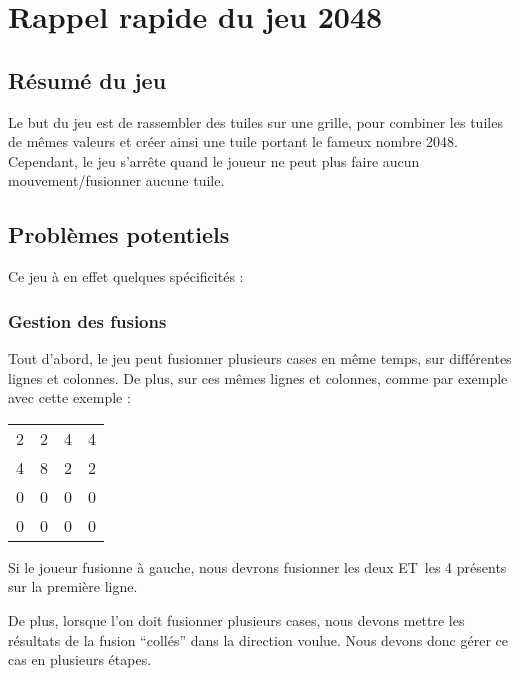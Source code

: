 \documentclass[letter]{article}
\date{\today}
\title{}
\begin{document}





\setcounter{tocdepth}{2}
\tableofcontents

\newpage

\section{Rappel rapide du jeu 2048}
\label{sec:org92ace60}

\subsection{Résumé du jeu}
\label{sec:org2219a01}

Le but du jeu est de rassembler des tuiles sur une grille, pour combiner les tuiles de mêmes valeurs et créer ainsi une tuile portant le fameux nombre 2048. Cependant, le jeu s'arrête quand le joueur ne peut plus faire aucun mouvement/fusionner aucune tuile.


\subsection{Problèmes potentiels}
\label{sec:org578c7bc}

Ce jeu à en effet quelques spécificités :

\subsubsection{Gestion des fusions}
\label{sec:org8f9db05}

Tout d'abord, le jeu peut fusionner plusieurs cases en même temps, sur différentes lignes et colonnes. De plus, sur ces mêmes lignes et colonnes, comme par exemple avec cette exemple :

\begin{center}
\begin{tabular}{rrrr}
2 & 2 & 4 & 4\\
4 & 8 & 2 & 2\\
0 & 0 & 0 & 0\\
0 & 0 & 0 & 0\\
\end{tabular}
\end{center}

Si le joueur fusionne à gauche, nous devrons fusionner les deux ET les 4 présents sur la première ligne.

De plus, lorsque l'on doit fusionner plusieurs cases, nous devons mettre les résultats de la fusion “collés” dans la direction voulue.
Nous devons donc gérer ce cas en plusieurs étapes.
\end{document}

